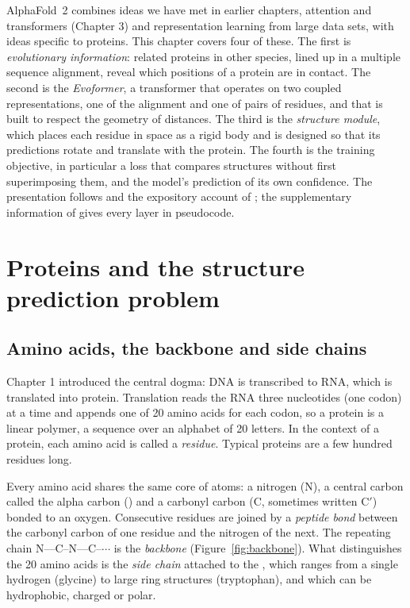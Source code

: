 AlphaFold~2 combines ideas we have met in earlier chapters, attention and transformers (Chapter 3) and representation learning from large data sets, with ideas specific to proteins. This chapter covers four of these. The first is \emph{evolutionary information}: related proteins in other species, lined up in a multiple sequence alignment, reveal which positions of a protein are in contact. The second is the \emph{Evoformer}, a transformer that operates on two coupled representations, one of the alignment and one of pairs of residues, and that is built to respect the geometry of distances. The third is the \emph{structure module}, which places each residue in space as a rigid body and is designed so that its predictions rotate and translate with the protein. The fourth is the training objective, in particular a loss that compares structures without first superimposing them, and the model's prediction of its own confidence. The presentation follows \citet{jumper2021} and the expository account of \citet{bouatta2021}; the supplementary information of \citet{jumper2021} gives every layer in pseudocode.

\section{Proteins and the structure prediction problem}
\label{sec:proteins}

\subsection{Amino acids, the backbone and side chains}

Chapter 1 introduced the central dogma: DNA is transcribed to RNA, which is translated into protein. Translation reads the RNA three nucleotides (one codon) at a time and appends one of 20 amino acids for each codon, so a protein is a linear polymer, a sequence over an alphabet of 20 letters. In the context of a protein, each amino acid is called a \emph{residue}. Typical proteins are a few hundred residues long.

Every amino acid shares the same core of atoms: a nitrogen (N), a central carbon called the alpha carbon (\Ca) and a carbonyl carbon (C, sometimes written C$'$) bonded to an oxygen. Consecutive residues are joined by a \emph{peptide bond} between the carbonyl carbon of one residue and the nitrogen of the next. The repeating chain N--\Ca--C--N--\Ca--C--$\cdots$ is the \emph{backbone} (Figure~\ref{fig:backbone}). What distinguishes the 20 amino acids is the \emph{side chain} attached to the \Ca, which ranges from a single hydrogen (glycine) to large ring structures (tryptophan), and which can be hydrophobic, charged or polar.

